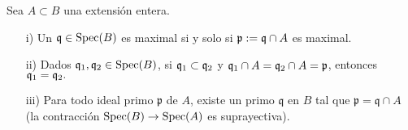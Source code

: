 \documentclass[../main.tex]{subfiles}
\begin{document}
\begin{proposition}\label{prop:lying} Sea $A\subset B$ una extensión entera.
\begin{itemize}
    \item[i)] Un $\mathfrak{q}\in\text{Spec}(B)$ es maximal si y solo si $\mathfrak{p}:=\mathfrak{q}\cap A$  es maximal.
    \item[ii)] Dados $\mathfrak{q}_1,\mathfrak{q}_2\in\text{Spec}(B)$, si $\mathfrak{q}_1\subset\mathfrak{q}_2$ y $\mathfrak{q}_1\cap A=\mathfrak{q}_2\cap A=\mathfrak{p}$, entonces $\mathfrak{q}_1=\mathfrak{q}_2.$
    \item[iii)] Para todo ideal primo $\mathfrak{p}$ de $A$, existe un primo $\mathfrak{q}$ en $B$ tal que $\mathfrak{p} = \mathfrak{q} \cap A$ (la contracción $\text{Spec}(B)\rightarrow\text{Spec}(A)$ es suprayectiva).
\end{itemize}
\end{proposition}
\end{document}
